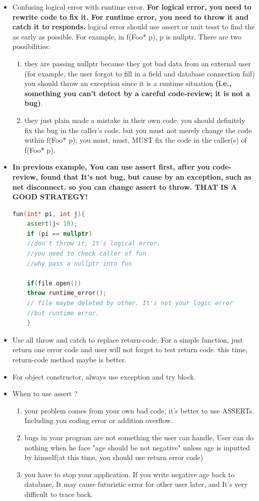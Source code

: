 \documentclass[a4paper,12pt,twoside]{book}
\begin{document}
\begin{itemize}
	\item Confusing logical error with runtime error. \textbf{For logical error, you need to rewrite code to fix it. For runtime error, you need to throw it and catch it to responds. } logical error should use assert  or unit tesst to find the as early as possible. For example, in f(Foo* p), p is nullptr. There are two possibilities:
	\begin{enumerate}
		\item they are passing nullptr because they got bad data from an external user (for example, the user forgot to fill in a field and database connection fail) you should throw an exception since it is a runtime situation \textbf{(i.e., something you can't detect by a careful code-review; it is not a bug)}.
		\item they just plain made a mistake in their own code. you should definitely fix the bug in the caller's code. but you must not merely change the code within f(Foo* p); you must, must, MUST fix the code in the caller(s) of f(Foo* p).
	\end{enumerate}
	\item \textbf{ In previous example, You can use assert first, after you code-review, found that It's not bug, but cause by an exception, such as net disconnect. so you can change assert to throw. THAT IS  A GOOD STRATEGY!}
	
	\begin{lstlisting}[frame=single, language=c++]
	fun(int* pi, int j){
	assert(j< 10);
	if (pi == nullptr)
	//don't throw it, It's logical error.
	//you need to check caller of fun
	//why pass a nullptr into fun
	
	if(file.open())
	throw runtime_error();
	// file maybe deleted by other. It's not your logic error
	//but runtime error.
	}
	\end{lstlisting}
	\item Use all throw and catch to replace return-code. For a simple function, just return one error code and user will not forget to test return code. this time, return-code method maybe is better.
	
	\item For object constructor, always use exception and try block.
	
	\item When to use assert ?
	\begin{enumerate}
		\item your problem comes from your own bad code, it's better to use ASSERTs.  Including you coding error or addition overflow.
		\item bugs in your program are not something the user can handle, User can do nothing when he face "age should be not negative" unless age is inputted by himself(at this time, you should use return error code)
		\item you have to stop your application. If you write negative age back to database, It may cause futuristic error for other user later, and It's very difficult to trace back.
	\end{enumerate}
	

\end{itemize}
\end{document}

